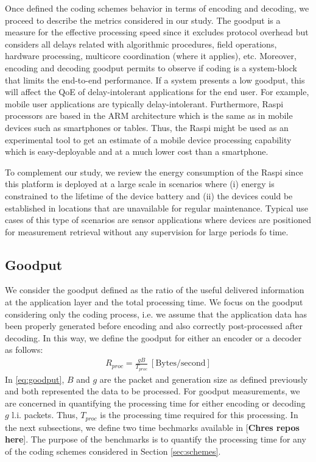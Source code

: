\label{sec:metrics}

Once defined the coding schemes behavior in terms of encoding
and decoding, we proceed to describe the metrics considered in our study.
The goodput is a measure for the effective processing speed since it
excludes protocol overhead but considers all delays related with
algorithmic procedures, field operations, hardware processing, multicore
coordination (where it applies), etc. Moreover, encoding and decoding
goodput permits to observe if coding is a system-block that limits the
end-to-end performance. If a system presents a low goodput, this will
affect the \ac{QoE} of delay-intolerant applications for the end user.
For example, mobile user applications are typically delay-intolerant.
Furthermore, \ac{Raspi} processors are based in the \ac{ARM} architecture
which is the same as in mobile devices such as smartphones or tables.
Thus, the \ac{Raspi} might be used as an experimental tool to get an
estimate of a mobile device processing capability which is easy-deployable
and at a much lower cost than a smartphone.

To complement our study, we review the energy consumption of the \ac{Raspi}
since this platform is deployed at a large scale in scenarios where (i)
energy is constrained to the lifetime of the device battery and (ii) the
devices could be established in locations that are unavailable for
regular maintenance. Typical use cases of this type of scenarios are
sensor applications where devices are positioned for measurement retrieval
without any supervision for large periods fo time.

\subsection{Goodput}
We consider the goodput defined as the ratio of the useful delivered
information at the application layer and the total processing time. We focus
on the goodput considering only the coding process, i.e. we assume that
the application data has been properly generated before encoding and
also correctly post-processed after decoding. In this way, we define
the goodput for either an encoder or a decoder as follows:
%
\begin{align} \label{eq:goodput}
R_{proc} = \frac{gB}{T_{proc}} ~ [\mathrm{Bytes/second}]
\end{align}
%
In \eqref{eq:goodput}, $B$ and $g$ are the packet and generation size
as defined previously and both represented the data to be processed. For
goodput measurements, we are concerned in quantifying the processing time
for either encoding or decoding $g$ \ac{l.i.} packets. Thus, $T_{proc}$ is
the processing time required for this processing. In the next subsections, we
define two time bechmarks available in [\textbf{Chres repos here}].
The purpose of the benchmarks is to quantify the processing time for
any of the coding schemes considered in Section \ref{sec:schemes}.

